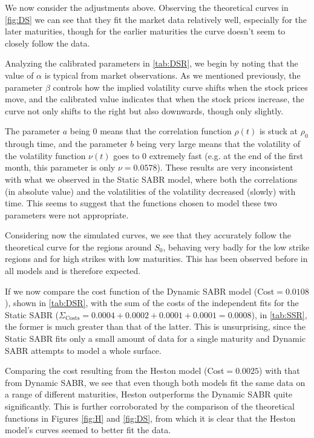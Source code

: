 We now consider the adjustments above. Observing the theoretical curves in \autoref{fig:DS} we can see that they fit the market data relatively well, especially for the later maturities, though for the earlier maturities the curve doesn't seem to closely follow the data.

Analyzing the calibrated parameters in \autoref{tab:DSR}, we begin by noting that the value of $\alpha$ is typical from market observations. As we mentioned previously, the parameter $\beta$ controls how the implied volatility curve shifts when the stock prices move, and the calibrated value indicates that when the stock prices increase, the curve not only shifts to the right but also downwards, though only slightly.

The parameter $a$ being $0$ means that the correlation function $\rho(t)$ is stuck at $\rho_0$ through time, and the parameter $b$ being very large means that the volatility of the volatility function $\nu(t)$ goes to $0$ extremely fast (e.g. at the end of the first month, this parameter is only $\nu=0.0578$). These results are very inconsistent with what we observed in the Static SABR model, where both the correlations (in absolute value) and the volatilities of the volatility decreased (slowly) with time. This seems to suggest that the functions chosen to model these two parameters were not appropriate.


Considering now the simulated curves, we see that they accurately follow the theoretical curve for the regions around $S_0$, behaving very badly for the low strike regions and for high strikes with low maturities. This has been observed before in all models and is therefore expected.

If we now compare the cost function of the Dynamic SABR model (Cost$=0.0108$), shown in \autoref{tab:DSR}, with the sum of the costs of the independent fits for the Static SABR ($\Sigma_{\mathrm{Costs}}=0.0004+0.0002+0.0001+0.0001=0.0008$), in \autoref{tab:SSR}, the former is much greater than that of the latter.
This is unsurprising, since the Static SABR fits only a small amount of data for a single maturity and Dynamic SABR attempts to model a whole surface.

Comparing the cost resulting from the Heston model (Cost$=0.0025$) with that from Dynamic SABR, we see that even though both models fit the same data on a range of different maturities, Heston outperforms the Dynamic SABR quite significantly. This is further corroborated by the comparison of the theoretical functions in Figures \ref{fig:H} and \ref{fig:DS}, from which it is clear that the Heston model's curves seemed to better fit the data.

